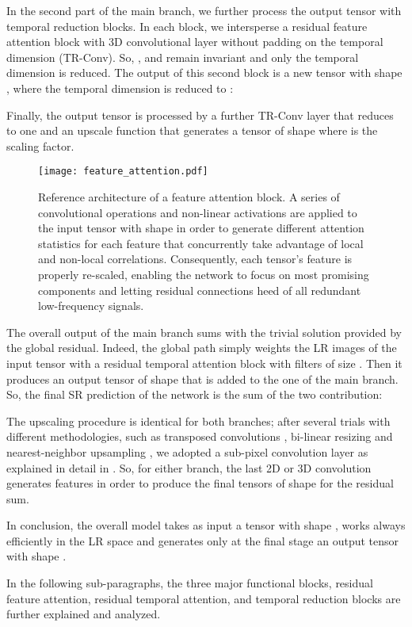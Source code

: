 \documentclass[journal]{IEEEtran}
\begin{document}
In the second part of the main branch, we further process the output tensor  with  temporal reduction blocks. In each block, we intersperse a residual feature attention block with 3D convolutional layer without padding on the temporal  dimension (TR-Conv). So, ,  and  remain invariant and only the temporal dimension is reduced. The output of this second block is a new tensor  with shape , where the temporal dimension  is reduced to :


Finally, the output tensor  is processed by a further TR-Conv layer that reduces  to one and an upscale function  that generates a tensor  of shape  where  is the scaling factor.
\begin{figure*}
\centering
\texttt{[image: feature\_attention.pdf]}
\caption{Reference architecture of a feature attention block. A series of convolutional operations and non-linear activations are applied to the input tensor with shape  in order to generate different attention statistics for each feature  that concurrently take advantage of local and non-local correlations. Consequently, each tensor's feature is properly re-scaled, enabling the network to focus on most promising components and letting residual connections heed of all redundant low-frequency signals.}
\label{fig:feature_attention}
\end{figure*}
The overall output  of the main branch sums with the trivial solution provided by the global residual. Indeed, the global path simply weights the  LR images of the input tensor  with a residual temporal attention block with filters of size . Then it produces an output tensor  of shape  that is added to the one of the main branch.  So, the final SR prediction of the network  is the sum of the two contribution:


The upscaling procedure is identical for both branches; 
after several trials with different methodologies, such as transposed convolutions \cite{deudon2020highres}, bi-linear resizing and nearest-neighbor upsampling \cite{van2017learned}, we adopted a sub-pixel convolution layer as explained in detail in \cite{shi2016real}. So, for either branch, the last 2D or 3D convolution generates  features in order to produce the final tensors of shape  for the residual sum.

In conclusion, the overall model takes as input a tensor  with shape , works always efficiently in the LR space and generates only at the final stage an output tensor  with shape . 

In the following sub-paragraphs, the three major functional blocks, residual feature attention, residual temporal attention, and temporal reduction blocks are further explained and analyzed.
\end{document}
